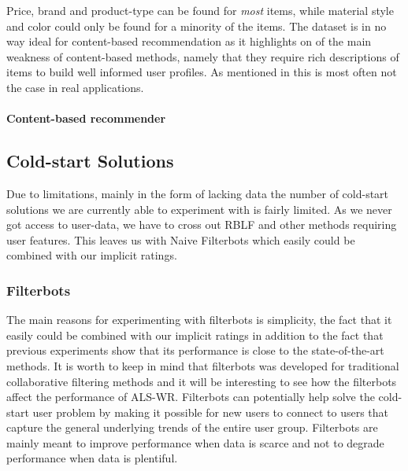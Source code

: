 Price, brand and product-type can be found for \emph{most} items, while material style and color could only be found for a minority of the items. The dataset is in no way ideal for content-based recommendation as it highlights on of the main weakness of content-based methods, namely that they require rich descriptions of items to build well informed user profiles. As mentioned in \cite{meyer2012recommender} this is most often not the case in real applications. 

\paragraph{Content-based recommender}

\subsection{Cold-start Solutions}

Due to limitations, mainly in the form of lacking data the number of cold-start solutions
we are currently able to experiment with is fairly limited. As we never got access to
user-data, we have to cross out RBLF and other methods requiring user features. This leaves us with
Naive Filterbots \cite{Park2006} which easily could be combined with our implicit ratings.

\subsubsection{Filterbots}

The main reasons for experimenting with filterbots is simplicity, the fact that it easily could
be combined with our implicit ratings in addition to the fact that previous experiments \cite{Agarwal2009, Agarwal2010} show that its performance is close to the state-of-the-art methods. It is worth to keep in mind that filterbots was developed for traditional collaborative filtering methods and it will be interesting to see how the filterbots affect the performance of ALS-WR. Filterbots can potentially help solve the cold-start user problem by making it possible for new users to connect to users that capture the general underlying trends of the entire user group. Filterbots are mainly meant to improve performance when data is scarce and not to degrade performance when data is plentiful.

